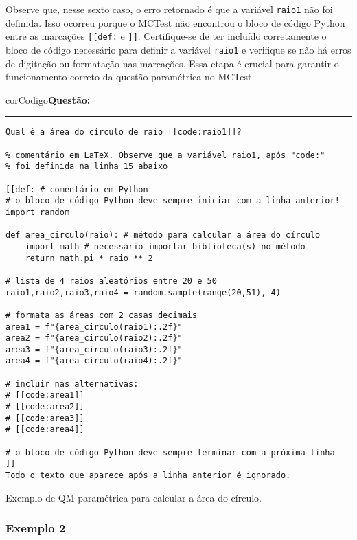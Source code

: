 Observe que, nesse sexto caso, o erro retornado é que a variável \verb|raio1| não foi definida. Isso ocorreu porque o MCTest não encontrou o bloco de código Python entre as marcações \verb|[[def:| e \verb|]]|. Certifique-se de ter incluído corretamente o bloco de código necessário para definir a variável \verb|raio1| e verifique se não há erros de digitação ou formatação nas marcações. Essa etapa é crucial para garantir o funcionamento correto da questão paramétrica no MCTest.

\begin{listing}[!ht]
\begin{myboxCode}{corCodigo}{\textbf{Questão: }}\vspace{3mm}
\hrule
\begin{verbatim}
Qual é a área do círculo de raio [[code:raio1]]?

% comentário em LaTeX. Observe que a variável raio1, após "code:" 
% foi definida na linha 15 abaixo

[[def: # comentário em Python
# o bloco de código Python deve sempre iniciar com a linha anterior!
import random

def area_circulo(raio): # método para calcular a área do círculo
    import math # necessário importar biblioteca(s) no método
    return math.pi * raio ** 2

# lista de 4 raios aleatórios entre 20 e 50
raio1,raio2,raio3,raio4 = random.sample(range(20,51), 4)

# formata as áreas com 2 casas decimais
area1 = f"{area_circulo(raio1):.2f}"
area2 = f"{area_circulo(raio2):.2f}"
area3 = f"{area_circulo(raio3):.2f}"
area4 = f"{area_circulo(raio4):.2f}"

# incluir nas alternativas:
# [[code:area1]]
# [[code:area2]]
# [[code:area3]]
# [[code:area4]]

# o bloco de código Python deve sempre terminar com a próxima linha
]]
Todo o texto que aparece após a linha anterior é ignorado.
\end{verbatim}
\end{myboxCode}
\caption{Exemplo de QM paramétrica para calcular a área do círculo.}
\label{lst:questaoQM_AreaCirculoEx1}
\end{listing}


\subsubsection{Exemplo 2}\label{sec:QMparametricaEx2}

